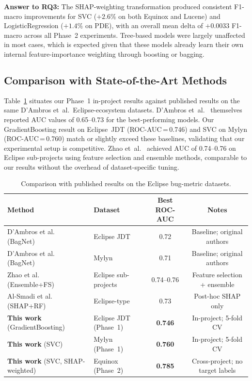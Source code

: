 \documentclass[12pt, a4paper]{article}
\newcommand{\RQ}[1]{\textbf{RQ#1}}
\newcommand{\model}[1]{\textsf{#1}}
\begin{document}
\noindent\textbf{Answer to \RQ{3}:} The SHAP-weighting transformation produced
consistent F1-macro improvements for \model{SVC} ($+2.6\%$ on both Equinox
and Lucene) and \model{LogisticRegression} ($+1.4\%$ on PDE), with an overall
mean delta of $+0.0033$ F1-macro across all Phase~2 experiments. Tree-based
models were largely unaffected in most cases, which is expected given that
these models already learn their own internal feature-importance weighting
through boosting or bagging.

\subsection{Comparison with State-of-the-Art Methods}

Table~\ref{tab:sota} situates our Phase~1 in-project results against published
results on the same D'Ambros et~al.\ Eclipse-ecosystem datasets.
D'Ambros et~al.~\cite{dambros2012} themselves reported AUC values of
0.65--0.73 for the best-performing models. Our \model{GradientBoosting}
result on Eclipse~JDT (ROC-AUC\,=\,0.746) and \model{SVC} on Mylyn
(ROC-AUC\,=\,0.760) match or slightly exceed these baselines, validating
that our experimental setup is competitive. Zhao et~al.~\cite{zhao2021}
achieved AUC of 0.74--0.76 on Eclipse sub-projects using feature selection
and ensemble methods, comparable to our results without the overhead of
dataset-specific tuning.

\begin{table}[H]
\caption{Comparison with published results on the Eclipse bug-metric datasets.}
\label{tab:sota}
\centering
\small
\renewcommand{\arraystretch}{1.2}
\begin{tabular}{@{}p{42mm}p{30mm}cc@{}}
\toprule
\textbf{Method} & \textbf{Dataset}
  & \textbf{Best ROC-AUC} & \textbf{Notes} \\
\midrule
D'Ambros et al.~\cite{dambros2012} (BagNet)
  & Eclipse JDT & 0.72 & Baseline; original authors \\
D'Ambros et al.~\cite{dambros2012} (BagNet)
  & Mylyn & 0.71 & Baseline; original authors \\
Zhao et al.~\cite{zhao2021} (Ensemble+FS)
  & Eclipse sub-projects & 0.74--0.76 & Feature selection + ensemble \\
Al-Smadi et al.~\cite{alsmadi2023} (SHAP+RF)
  & Eclipse-type & 0.73 & Post-hoc SHAP only \\
\textbf{This work} (\model{GradientBoosting})
  & Eclipse JDT (Phase~1) & \textbf{0.746} & In-project; 5-fold CV \\
\textbf{This work} (\model{SVC})
  & Mylyn (Phase~1) & \textbf{0.760} & In-project; 5-fold CV \\
\textbf{This work} (\model{SVC}, SHAP-weighted)
  & Equinox (Phase~2) & \textbf{0.785} & Cross-project; no target labels \\
\bottomrule
\end{tabular}
\end{table}
\end{document}
